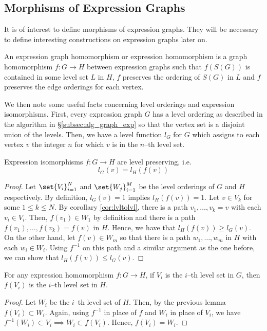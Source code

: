 
\subsection{Morphisms of Expression Graphs}

It is of interest to define morphisms of expression graphs. They will be
necessary to define interesting constructions on expression graphs later on.

\begin{defn}
An expression graph homomorphism or expression homomorphism is a graph
homomorphism $f : G \to H$ between expression graphs such that $f(S(G))$ is
contained in some level set $L$ in $H$, $f$ preserves the ordering of $S(G)$ in
$L$ and $f$ preserves the edge orderings for each vertex.
\end{defn}

We then note some useful facts concerning level orderings and expression
isomorphisms. First, every expression graph $G$ has a level ordering as
described in the algorithm in \S\ref{subsec:alg_graph_exp} so that the vertex
set is a disjoint union of the levels. Then, we have a level function $l_G$ for
$G$ which assigns to each vertex $v$ the integer $n$ for which $v$ is in the
$n$--th level set.

\begin{lem}\label{thm:expiso_lvlpres}
Expression isomorphisms $f : G \to H$ are level preserving, i.e.
\[
  l_G(v) = l_H(f(v))
\]
\end{lem}
\begin{proof}
Let
$\set{V_i}_{i = 1}^{N}$ and
$\set{W_j}_{i = 1}^{M}$ be the level orderings of $G$ and $H$
respectively. By definition, $l_G(v) = 1$ implies
$l_H(f(v)) = 1$. Let $v \in V_k$ for some $1 \leq k \leq N$.
By corollary \ref{cor:lvltolvl}, there is a path $v_1, \dots, v_k = v$ with each
$v_i \in V_i$. Then, $f(v_1) \in W_1$ by definition and there is a path
$f(v_1), \dots, f(v_k) = f(v)$ in $H$. Hence, we have that
$l_H(f(v)) \geq l_G(v)$. On the other hand, let $f(v) \in W_m$ so that there is
a path $w_1, \dots, w_m$ in $H$ with each $w_i \in W_i$. Using $f^{-1}$ on this
path and a similar argument as the one before, we can show that
$l_H(f(v)) \leq l_G(v)$.
\end{proof}

\begin{cor}
For any expression homomorphism $f : G \to H$, if $V_i$ is the $i$--th level set
in $G$, then $f(V_i)$ is the $i$--th level set in $H$.
\end{cor}
\begin{proof}
Let $W_i$ be the $i$--th level set of $H$. Then, by the previous lemma
$f(V_i) \subset W_i$. Again, using $f^{-1}$ in place of $f$ and $W_i$ in place
of $V_i$, we have
$f^{-1}(W_i) \subset V_i \implies W_i \subset f(V_i)$. Hence, $f(V_i) = W_i$.
\end{proof}

